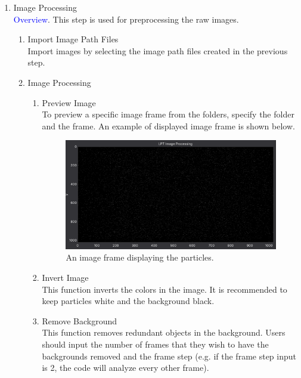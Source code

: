 \documentclass[a4paper,fleqn]{article}
\begin{document}
\begin{enumerate}
\begin{enumerate}
    \end{enumerate} 

    \item Image Processing\\
    \textcolor{blue}{Overview}. This step is used for preprocessing the raw images. 
    
    \begin{enumerate}
        \item Import Image Path Files\\
        Import images by selecting the image path files created in the previous step.

        \item Image Processing
        \begin{enumerate}
            \item Preview Image\\
            To preview a specific image frame from the folders, specify the folder and the frame. An example of displayed image frame is shown below. 
            \begin{figure}[h]
                \centering
                \includegraphics[width=\linewidth]{Fig/Screenshot (14).png}
                \caption{An image frame displaying the particles.}
                \label{fig:GUI_imgpre}
            \end{figure}

        \item Invert Image\\
        This function inverts the colors in the image. It is recommended to keep particles white and the background black. 

        \item Remove Background\\
        This function removes redundant objects in the background. Users should input the number of frames that they wish to have the backgrounds removed and the frame step (e.g. if the frame step input is 2, the code will analyze every other frame). 


\end{enumerate}
\end{enumerate}
\end{enumerate}
\end{document}
